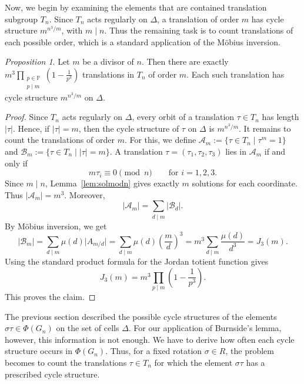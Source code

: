 \documentclass[12pt]{article}
\theoremstyle{definition}
\theoremstyle{remark}
\newtheorem{proposition}[theorem]{Proposition}
\begin{document}
Now, we begin by examining the elements that are contained translation subgroup $T_n$. Since $T_n$ acts regularly on $\Delta$, a translation of order $m$ has cycle structure $m^{n^3/m}$, with $m\mid n$.
Thus the remaining task is to count translations of each possible order, which is a standard application of the Möbius inversion.
\begin{proposition}\label{prop:translations}
    Let $m$ be a divisor of $n.$
    Then there are exactly $m^3\prod_{\substack{p\in \mathbb{P}\\ p\mid m}}\left(1-\frac{1}{p^3}\right) $ translations in $T_n$ of order $m.$ Each such translation has cycle structure $m^{n^3/m}$ on $\Delta$.
\end{proposition}
\begin{proof}
Since $T_n$ acts regularly on $\Delta$, every orbit of a translation
$\tau\in T_n$ has length $\vert \tau\vert $. Hence, if $\vert \tau\vert =m$, then the cycle
structure of $\tau$ on $\Delta$ is $m^{n^3/m}.$
It remains to count the translations of order $m$. For this, we define
$\mathcal A_m:=\{\tau\in T_n\mid \tau^m=1\}
$ and $\mathcal B_m:=\{\tau\in T_n\mid |\tau\vert =m\}$.
A translation $\tau=(\tau_1,\tau_2,\tau_3)$ lies in $\mathcal A_m$ if and
only if
\[
m\tau_i\equiv 0 \pmod n
\qquad\text{for } i=1,2,3.
\]
Since $m\mid n$, Lemma~\ref{lem:solmodn} gives exactly $m$ solutions for
each coordinate. Thus $\vert \mathcal A_m\vert =m^3$.
Moreover,
\[
\vert\mathcal A_m\vert =\sum_{d\mid m}|\mathcal B_d|.
\]
By Möbius inversion, we get
\[
|\mathcal B_m\vert
=
\sum_{d\mid m}\mu(d)\vert A_{m/d}\vert
=\sum_{d\mid m}\mu(d)\left(\frac{m}{d}\right)^3=
m^3\sum_{d\mid m}\frac{\mu(d)}{d^3}
=
J_3(m).
\]
Using the standard product formula for the Jordan totient function gives
\[
J_3(m)=m^3\prod_{p\mid m}\left(1-\frac{1}{p^3}\right).
\]
This proves the claim.
\end{proof}

The previous section described the possible cycle structures of the elements $\sigma\tau\in\Phi(G_n)$ on the set of cells $\Delta$.
For our application of Burnside's lemma, however, this information is not enough.  We have to derive  how often each cycle structure occurs in $\Phi(G_n)$.
Thus, for a fixed rotation $\sigma\in R$, the problem becomes to count the translations $\tau\in T_n$ for which the element $\sigma\tau$ has a prescribed cycle structure.
\end{document}
